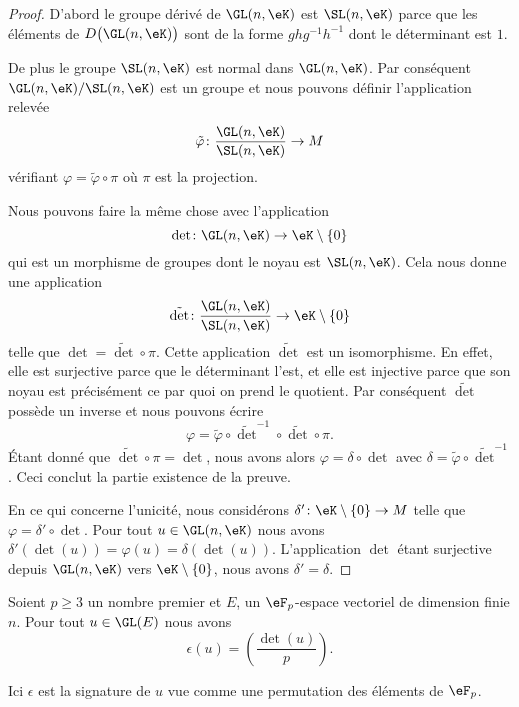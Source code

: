 \begin{proof}
	D'abord le groupe dérivé de \( \GL(n,\eK)\) est \( \SL(n,\eK)\) parce que les éléments de \( D\big( \GL(n,\eK) \big)\) sont de la forme \( ghg^{-1}h^{-1}\) dont le déterminant est \( 1\).

	De plus le groupe \( \SL(n,\eK)\) est normal dans \( \GL(n,\eK)\). Par conséquent \( \GL(n,\eK)/\SL(n,\eK)\) est un groupe et nous pouvons définir l'application relevée
	\begin{equation}
		\tilde \varphi\colon \frac{ \GL(n,\eK) }{ \SL(n,\eK) }\to M
	\end{equation}
	vérifiant \( \varphi=\tilde \varphi\circ\pi\) où \( \pi\) est la projection.

	Nous pouvons faire la même chose avec l'application
	\begin{equation}
		\det\colon \GL(n,\eK)\to \eK\setminus\{ 0 \}
	\end{equation}
	qui est un morphisme de groupes dont le noyau est \( \SL(n,\eK)\). Cela nous donne une application
	\begin{equation}
		\tilde \det\colon \frac{ \GL(n,\eK) }{ \SL(n,\eK) }\to \eK\setminus\{ 0 \}
	\end{equation}
	telle que \( \det=\tilde \det\circ\pi\). Cette application \( \tilde \det\) est un isomorphisme. En effet, elle est surjective parce que le déterminant l'est, et elle est injective parce que son noyau est précisément ce par quoi on prend le quotient. Par conséquent \( \tilde \det \) possède un inverse et nous pouvons écrire
	\begin{equation}
		\varphi=\tilde \varphi\circ\tilde \det^{-1}\circ\tilde \det\circ\pi.
	\end{equation}
	Étant donné que \( \tilde \det\circ\pi=\det\), nous avons alors \( \varphi=\delta\circ\det\) avec \( \delta=\tilde \varphi\circ\tilde \det^{-1}\). Ceci conclut la partie existence de la preuve.

	En ce qui concerne l'unicité, nous considérons \( \delta'\colon \eK\setminus\{ 0 \}\to M\) telle que \( \varphi=\delta'\circ\det\). Pour tout \( u\in \GL(n,\eK)\) nous avons \( \delta'(\det(u))=\varphi(u)=\delta(\det(u))\). L'application \( \det\) étant surjective depuis \( \GL(n,\eK)\) vers \( \eK\setminus\{ 0 \}\), nous avons \( \delta'=\delta\).
\end{proof}

\begin{theorem}
	Soient \( p\geq 3\) un nombre premier et \( E\), un \( \eF_p\)-espace vectoriel de dimension finie \( n\). Pour tout \( u\in\GL(E)\) nous avons
	\begin{equation}
		\epsilon(u)=\left(\frac{\det(u)}{p}\right).
	\end{equation}
\end{theorem}
Ici \( \epsilon\) est la signature de \( u \) vue comme une permutation des éléments de \( \eF_p\).

